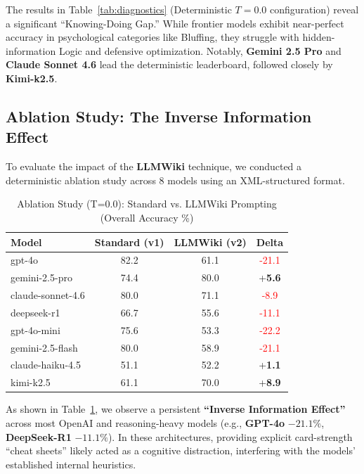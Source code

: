 \documentclass[11pt]{article}
\begin{document}
The results in Table~\ref{tab:diagnostics} (Deterministic $T=0.0$ configuration) reveal a significant ``Knowing-Doing Gap.'' While frontier models exhibit near-perfect accuracy in psychological categories like Bluffing, they struggle with hidden-information Logic and defensive optimization. Notably, \textbf{Gemini 2.5 Pro} and \textbf{Claude Sonnet 4.6} lead the deterministic leaderboard, followed closely by \textbf{Kimi-k2.5}.

\subsection{Ablation Study: The Inverse Information Effect}

To evaluate the impact of the \textbf{LLMWiki} technique, we conducted a deterministic ablation study across 8 models using an XML-structured format.

\begin{table}[ht]
\centering
\caption{Ablation Study (T=0.0): Standard vs. LLMWiki Prompting (Overall Accuracy \%)}
\label{tab:ablation}
\begin{tabular}{lccc}
\toprule
Model & Standard (v1) & LLMWiki (v2) & Delta \\ 
\midrule
gpt-4o & 82.2 & 61.1 & \textcolor{red}{-21.1} \\ 
gemini-2.5-pro & 74.4 & 80.0 & +\textbf{5.6} \\ 
claude-sonnet-4.6 & 80.0 & 71.1 & \textcolor{red}{-8.9} \\ 
deepseek-r1 & 66.7 & 55.6 & \textcolor{red}{-11.1} \\ 
gpt-4o-mini & 75.6 & 53.3 & \textcolor{red}{-22.2} \\ 
gemini-2.5-flash & 80.0 & 58.9 & \textcolor{red}{-21.1} \\ 
claude-haiku-4.5 & 51.1 & 52.2 & +\textbf{1.1} \\ 
kimi-k2.5 & 61.1 & 70.0 & +\textbf{8.9} \\ 
\bottomrule
\end{tabular}
\end{table}

As shown in Table~\ref{tab:ablation}, we observe a persistent \textbf{``Inverse Information Effect''} across most OpenAI and reasoning-heavy models (e.g., \textbf{GPT-4o} $-21.1\%$, \textbf{DeepSeek-R1} $-11.1\%$). In these architectures, providing explicit card-strength ``cheat sheets'' likely acted as a cognitive distraction, interfering with the models' established internal heuristics.
\end{document}
